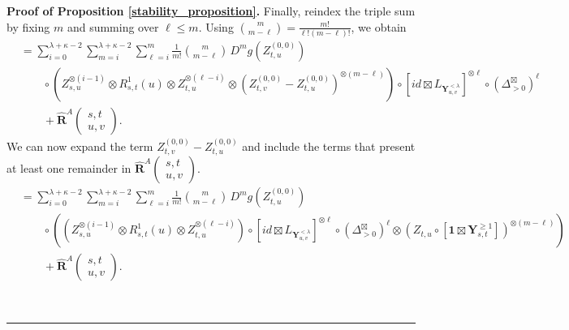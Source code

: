 \documentclass{article}%
\newenvironment{proof}[1][Proof]{\noindent\textbf{#1.} }{\ \rule{0.5em}{0.5em}}
\begin{document}
\begin{proof}[Proof of Proposition \ref{stability_proposition}]
Finally, reindex the triple sum by fixing $m$ and summing over $\ell\le m$.
Using $\binom{m}{m-\ell}=\frac{m!}{\ell!(m-\ell)!}$, we obtain
\begin{align*}
&=
\sum_{i=0}^{\lambda+\kappa-2}
\sum_{m=i}^{\lambda+\kappa-2}
\sum_{\ell=i}^{m}
\frac{1}{m!}\binom{m}{m-\ell}\,
D^m g\left(Z^{(0,0)}_{t,u}\right)
\\
&\qquad\circ
\left(
Z^{\otimes(i-1)}_{s,u}\otimes R^{1}_{s,t}(u)\otimes Z^{\otimes(\ell-i)}_{t,u}
\otimes
\left(Z^{(0,0)}_{t,v}-Z^{(0,0)}_{t,u}\right)^{\otimes(m-\ell)}
\right)
\circ
\left[id \boxtimes L_{\mathbf{Y}^{<\lambda}_{u,v}}\right]^{\otimes\ell}
\circ (\Delta^{\boxtimes}_{>0})^\ell
\\
&\qquad + \hat{\mathbf{R}}^{A}\begin{pmatrix} s,t \\ u, v \end{pmatrix}.
\end{align*}
We can now expand the term $Z^{(0,0)}_{t,v} - Z^{(0,0)}_{t,u}$ and include the terms that present at least one remainder in $\hat{\mathbf{R}}^{A}\begin{pmatrix} s,t \\ u, v \end{pmatrix}$.\newline
\begin{align*}
&=
\sum_{i=0}^{\lambda+\kappa-2}
\sum_{m=i}^{\lambda+\kappa-2}
\sum_{\ell=i}^{m}
\frac{1}{m!}\binom{m}{m-\ell}\,
D^m g\left(Z^{(0,0)}_{t,u}\right)
\\
&\qquad \circ \left(
\left(
Z^{\otimes(i-1)}_{s,u}\otimes R^{1}_{s,t}(u)\otimes Z^{\otimes(\ell-i)}_{t,u}
\right)
\circ 
\left[id \boxtimes L_{\mathbf{Y}^{<\lambda}_{u,v}}\right]^{\otimes\ell}
\circ (\Delta^{\boxtimes}_{>0})^\ell \otimes
\left(Z_{t,u} \circ [ \mathbf{1} \boxtimes \mathbf{Y}^{\geq 1}_{s,t}  ]\right)^{\otimes(m-\ell)} \right)
\\
&\qquad + \hat{\mathbf{R}}^{A}\begin{pmatrix} s,t \\ u, v \end{pmatrix}.
\end{align*}
    

\end{proof}
\end{document}
